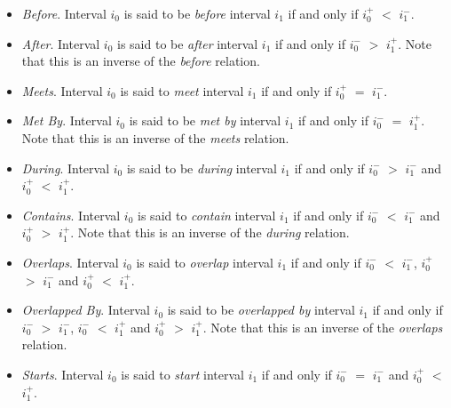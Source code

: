 \documentclass[11pt]{report}
\begin{document}
        \begin{itemize}
          \item
            {\em Before}.
            Interval ${i_0}$ is said to be {\em before} interval ${i_1}$ if and
            only if ${i_0^+}$ $<$ ${i_1^-}$.

          \item
            {\em After}.
            Interval ${i_0}$ is said to be {\em after} interval ${i_1}$ if and
            only if ${i_0^-}$ $>$ ${i_1^+}$. Note that this is an inverse of
            the {\em before} relation.

          \item
            {\em Meets}.
            Interval ${i_0}$ is said to {\em meet} interval ${i_1}$ if and only
            if ${i_0^+}$ $=$ ${i_1^-}$.

          \item
            {\em Met By}.
            Interval ${i_0}$ is said to be {\em met by} interval ${i_1}$ if and
            only if ${i_0^-}$ $=$ ${i_1^+}$. Note that this is an inverse of
            the {\em meets} relation.

          \item
            {\em During}.
            Interval ${i_0}$ is said to be {\em during} interval ${i_1}$ if and
            only if ${i_0^-}$ $>$ ${i_1^-}$ and ${i_0^+}$ $<$ ${i_1^+}$.

          \item
            {\em Contains}.
            Interval ${i_0}$ is said to {\em contain} interval ${i_1}$ if and
            only if ${i_0^-}$ $<$ ${i_1^-}$ and ${i_0^+}$ $>$ ${i_1^+}$. Note
            that this is an inverse of the {\em during} relation.

          \item
            {\em Overlaps}.
            Interval ${i_0}$ is said to {\em overlap} interval ${i_1}$ if and
            only if ${i_0^-}$ $<$ ${i_1^-}$, ${i_0^+}$ $>$ ${i_1^-}$ and
            ${i_0^+}$ $<$ ${i_1^+}$.

          \item
            {\em Overlapped By}.
            Interval ${i_0}$ is said to be {\em overlapped by} interval
            ${i_1}$ if and only if ${i_0^-}$ $>$ ${i_1^-}$, ${i_0^-}$ $<$
            ${i_1^+}$ and ${i_0^+}$ $>$ ${i_1^+}$. Note that this is an
            inverse of the {\em overlaps} relation.

          \item
            {\em Starts}.
            Interval ${i_0}$ is said to {\em start} interval ${i_1}$ if and
            only if ${i_0^-}$ $=$ ${i_1^-}$ and ${i_0^+}$ $<$ ${i_1^+}$.


\end{itemize}
\end{document}
